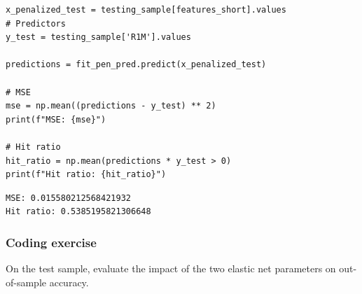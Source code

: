 \begin{verbatim}
x_penalized_test = testing_sample[features_short].values                     # Predictors
y_test = testing_sample['R1M'].values

predictions = fit_pen_pred.predict(x_penalized_test)

# MSE
mse = np.mean((predictions - y_test) ** 2)
print(f"MSE: {mse}")

# Hit ratio
hit_ratio = np.mean(predictions * y_test > 0)
print(f"Hit ratio: {hit_ratio}")
\end{verbatim}

\begin{verbatim}
MSE: 0.015580212568421932
Hit ratio: 0.5385195821306648
\end{verbatim}

\subsubsection{Coding exercise}

On the test sample, evaluate the impact of the two elastic net parameters on out-of-sample accuracy.